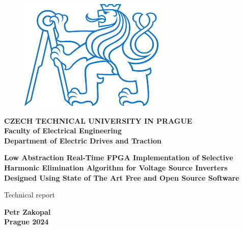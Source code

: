 \documentclass[a4paper, twoside, 11pt]{article}
\begin{document}
\setcounter{figure}{0}

\begin{titlepage}
	\begin{center}

\begin{figure}[H]
	\begin{center}
		\includegraphics[scale=1]{src/misc/symbol_cvut_konturova_verze.pdf}
	\end{center}
\end{figure}
	{\Large{\textbf{CZECH TECHNICAL UNIVERSITY IN PRAGUE}}}\\
	{\textbf{Faculty of Electrical Engineering}}\\
	{\textbf{Department of Electric Drives and Traction}}
	
	\vspace{3cm}
	
	
	{\Large\textbf{Low Abstraction Real-Time FPGA Implementation of Selective Harmonic Elimination Algorithm for Voltage Source Inverters Designed Using State of The Art Free and Open Source Software}}
	
	\vspace{1cm}
	
	
	
	Technical report\\
	
	\end{center}
	
	\vspace{3cm}
	
	
	\vspace{0.5cm}
	
	\vfill
	
\begin{center}

	\large{\textbf{Petr Zakopal}}\\
	\large{\textbf{Prague 2024}}
	\end{center}
\end{titlepage}
\end{document}
